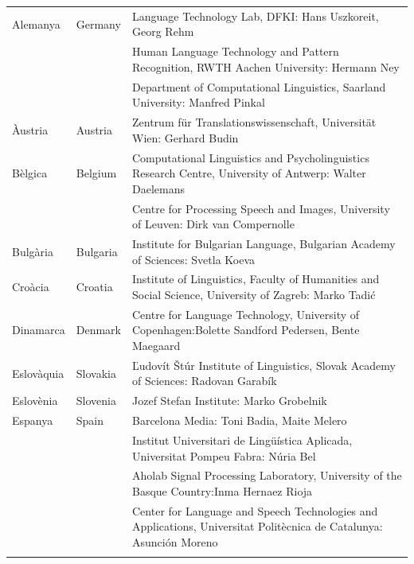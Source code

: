 \begin{longtable}{@{}llp{114mm}@{}}
  Alemanya & \textcolor{grey1}{Germany} & Language Technology Lab, DFKI: Hans Uszkoreit, Georg Rehm\\ \addlinespace
  & & Human Language Technology and Pattern Recognition, RWTH Aachen University: Hermann Ney \\ \addlinespace
  & & Department of Computational Linguistics, Saarland University: Manfred Pinkal\\ \addlinespace 
  Àustria & \textcolor{grey1}{Austria} & Zentrum für Translationswissenschaft, Universität Wien: Gerhard Budin\\ \addlinespace 
  Bèlgica & \textcolor{grey1}{Belgium} & Computational Linguistics and Psycholinguistics Research Centre, University of Antwerp: Walter Daelemans\\ \addlinespace
  & & Centre for Processing Speech and Images, University of Leuven: Dirk van Compernolle \\ \addlinespace
  Bulgària & \textcolor{grey1}{Bulgaria} & Institute for Bulgarian Language, Bulgarian Academy of Sciences: Svetla Koeva \\ \addlinespace
  Croàcia & \textcolor{grey1}{Croatia} & Institute of Linguistics, Faculty of Humanities and Social Science, University of Zagreb: Marko Tadić \\ \addlinespace
  Dinamarca &  \textcolor{grey1}{Denmark} & Centre for Language Technology, University of Copenhagen:\newline Bolette Sandford Pedersen, Bente Maegaard\\ \addlinespace
  Eslovàquia & \textcolor{grey1}{Slovakia} & Ľudovít Štúr Institute of Linguistics, Slovak Academy of Sciences: Radovan Garabík \\ \addlinespace 
  Eslovènia & \textcolor{grey1}{Slovenia} & Jozef Stefan Institute: Marko Grobelnik \\ \addlinespace 
  Espanya & \textcolor{grey1}{Spain} & Barcelona Media: Toni Badia, Maite Melero \\ \addlinespace 
  & & Institut Universitari de Lingüística Aplicada, Universitat Pompeu Fabra: Núria Bel \\ \addlinespace 
  & & Aholab Signal Processing Laboratory, University of the Basque Country:\newline Inma Hernaez Rioja \\ \addlinespace 
  & & Center for Language and Speech Technologies and Applications, Universitat Politècnica de Catalunya:  Asunción Moreno \\ \addlinespace 

\end{longtable}
